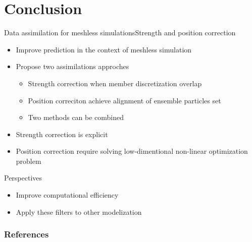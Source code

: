 \documentclass[aspectratio=169]{beamer} %
\begin{document}
\section{Conclusion}
\begin{frame}{Data assimilation for meshless simulations}{Strength and position correction}

    \begin{itemize}
        \item Improve prediction in the context of meshless simulation
        \item Propose two assimilations approches
              \begin{itemize}
                  \item Strength correction when member discretization overlap
                  \item Position correciton achieve alignment of ensemble particles set
                  \item Two methods can be combined
              \end{itemize}
        \item Strength correction is explicit %
        \item Position correction require solving low-dimentional non-linear optimization problem
    \end{itemize}
    \vfill
    \begin{block}{Perspectives}
        \begin{itemize}
            \item Improve computational efficiency
            \item Apply these filters to other modelization
        \end{itemize}
    \end{block}
\end{frame}

\closingframe

\begin{frame}
    \frametitle{References}
    \printbibliography %
\end{frame}

\end{document}
